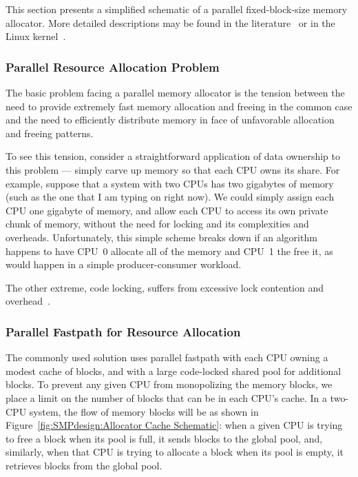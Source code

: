 This section presents a simplified schematic of a parallel fixed-block-size
memory allocator.
More detailed descriptions may be found in the
literature~\cite{McKenney92a,McKenney93,Bonwick01slab,McKenney01e}
or in the Linux kernel~\cite{Torvalds2.6kernel}.

\subsubsection{Parallel Resource Allocation Problem}

The basic problem facing a parallel memory allocator is the tension
between the need to provide extremely fast memory allocation and
freeing in the common case and the need to efficiently distribute
memory in face of unfavorable allocation and freeing patterns.

To see this tension, consider a straightforward application of
data ownership to this problem --- simply carve up memory so that
each CPU owns its share.
For example, suppose that a system with two CPUs has two gigabytes
of memory (such as the one that I am typing on right now).
We could simply assign each CPU one gigabyte of memory, and allow
each CPU to access its own private chunk of memory, without the
need for locking and its complexities and overheads.
Unfortunately, this simple scheme breaks down if an algorithm happens
to have CPU~0 allocate all of the memory and CPU~1 the free it, as
would happen in a simple producer-consumer workload.

The other extreme, code locking, suffers from excessive lock contention
and overhead~\cite{McKenney93}.

\subsubsection{Parallel Fastpath for Resource Allocation}

The commonly used solution uses parallel fastpath with each CPU
owning a modest cache of blocks, and with a large code-locked
shared pool for additional blocks.
To prevent any given CPU from monopolizing the memory blocks,
we place a limit on the number of blocks that can be in each CPU's
cache.
In a two-CPU system, the flow of memory blocks will be as shown
in Figure~\ref{fig:SMPdesign:Allocator Cache Schematic}:
when a given CPU is trying to free a block when its pool is full,
it sends blocks to the global pool, and, similarly, when that CPU
is trying to allocate a block when its pool is empty, it retrieves
blocks from the global pool.

